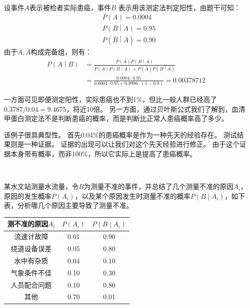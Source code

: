 设事件$A$表示被检者实际患癌，事件$B$ 表示用该测定法判定阳性，由题干可知：
\begin{align*}
&P\left( A \right) =0.0004 \\
&P\left( B \middle| A \right) =0.95 \\
&P\left( \bar{B} \middle| \bar{A} \right) =0.90
\end{align*}
由于$A,\bar{A}$构成完备组，则有：
\begin{align*}
P\left( A \middle| B \right) &=\frac{P\left( A \right) P\left( B \middle| A \right)}{P\left( A \right) P\left( B \middle| A \right) +P\left( \bar{A} \right) P\left( B \middle| \bar{A} \right)} \\
&=\frac{0.0004\cdot 0.95}{0.0004\cdot 0.95+0.9996\cdot \left( 1-0.9 \right)} =0.00378712
\end{align*}

一方面可见即便测定阳性，实际患癌也不到1\%，但比一般人群已经高了$0.3787/0.04=9.4675$，将近10倍。
另一方面，通过贝叶斯公式我们了解到，血清甲蛋白测定法不是判断患癌的概率，而是判断比正常人患癌概率高了多少。

\begin{tcolorbox}
该例子很具典型性。
首先0.04\%的患癌概率是作为一种先天的经验存在。
测试结果则是一种证据。
证据的出现可以让我们对这个先天经验进行修正。
由于这个证据本身带有概率，而非100\%，所以它实际上是提高了患癌概率。
\end{tcolorbox}

~

\begin{example}
某水文站测量水流量，令$B$为测量不准的事件，并总结了几个测量不准的原因$A_i$，原因的发生概率$P\left( A_i \right) $，以及某个原因发生时测量不准的概率$P\left( B \middle| A_i \right) $，如下表，分析哪几个原因主要导致了测量不准。
\begin{table}[h]
\centering
\begin{tabular}{ccc}
    \toprule
    测不准的原因$A_i$ & $P\left( A_i \right) $ & $P\left( B \middle| A_i \right) $\\
    \midrule
    流速计故障 & 0.01 & 0.90\\
    绕道设备误差 & 0.05 & 0.80\\
    水中有杂质 & 0.04 & 0.10\\
    气象条件不佳 & 0.10 & 0.30\\
    人员配合问题 & 0.10 & 0.80\\
    其他 & 0.70 & 0.01\\
    \bottomrule
\end{tabular}
\end{table}
\end{example}

